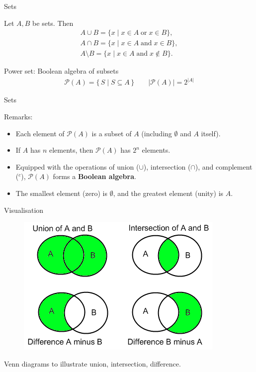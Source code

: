 \begin{frame}{Sets}
\begin{block}{Let \(A, B\) be sets.}
Then\vspace{-0.5cm}
\begin{align*}
A \cup B = \{ x \mid x\in A \;\text{or}\; x\in B\}, \\
A \cap B = \{ x \mid x\in A \;\text{and}\; x\in B\}, \\
A \setminus B = \{ x \mid x\in A \;\text{and}\; x\notin B\}.
\end{align*}
\end{block}

\begin{block}{Power set:}
Boolean algebra of subsets
\begin{align*}
\mathcal{P}(A) = \{\, S \mid S \subseteq A \,\}\qquad |\mathcal{P}(A)| = 2^{|A|}
\end{align*}

\end{block}
\end{frame}

\begin{frame}{Sets}
\begin{block}{Remarks:}
\begin{itemize}
  \item Each element of $\mathcal{P}(A)$ is a subset of $A$ (including $\emptyset$ and $A$ itself).
  \item If $A$ has $n$ elements, then $\mathcal{P}(A)$ has $2^n$ elements.
  \item Equipped with the operations of union ($\cup$), intersection ($\cap$), and complement ($^c$), $\mathcal{P}(A)$ forms a \textbf{Boolean algebra}.
  \item The smallest element (zero) is $\emptyset$, and the greatest element (unity) is $A$.
\end{itemize}
\end{block}
\end{frame}

\begin{frame}{Visualisation}
\begin{figure}
    \centering
    \includegraphics[width=0.7\linewidth]{Image2.png}
\end{figure}
Venn diagrams to illustrate union, intersection, difference.
\end{frame}

